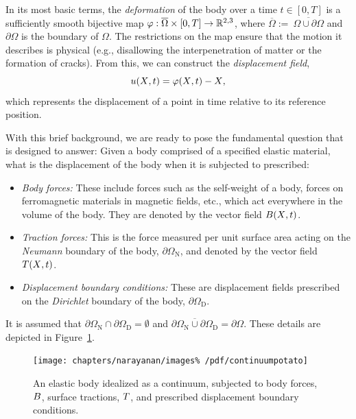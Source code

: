 In its most basic terms, the {\em deformation} of the body over a time
$t \in [0, T]$ is a sufficiently smooth bijective map $\mbox{$\varphi$}:
\overline{\Omega} \times [0,T] \rightarrow \mathbb{R}^{2, 3}$, where
$\overline{\Omega} :=\ \overline{\Omega\cup\partial\Omega}$ and
$\partial\Omega$ is the boundary of $\Omega$. The restrictions on the
map ensure that the motion it describes is physical (e.g., disallowing
the interpenetration of matter or the formation of cracks). From this,
we can construct the {\em displacement field},
\begin{equation}
  \mbox{$ u$}(\mbox{$ X$}, t) = \mbox{$\varphi$}(\mbox{$ X$}, t) - \mbox{$ X$},
\end{equation}
which represents the displacement of a point in time
relative to its reference position.

With this brief background, we are ready to pose the fundamental
question that \twist{} is designed to answer: Given a body comprised
of a specified elastic material, what is the displacement of the body
when it is subjected to prescribed:
\begin{itemize}
\item {\em Body forces:} These include forces such as the self-weight
  of a body, forces on ferromagnetic materials in magnetic fields,
  etc., which act everywhere in the volume of the body. They are
  denoted by the vector field $\mbox{$ B$}(\mbox{$ X$}, t)$.
\item {\em Traction forces:} This is the force measured per unit
  surface area acting on the {\em Neumann} boundary of the body,
  $\partial\Omega_{\mathrm{N}}$, and denoted by the vector field
  $\mbox{$ T$}(\mbox{$ X$}, t)$.
\item {\em Displacement boundary conditions:} These are displacement
  fields prescribed on the {\em Dirichlet} boundary of the body,
  $\partial\Omega_{\mathrm{D}}$.
\end{itemize}
It is assumed that $\partial\Omega_{\mathrm{N}}
\cap \partial\Omega_{\mathrm{D}} = \emptyset$ and
$\overline{\partial\Omega_{\mathrm{N}} \cup \partial\Omega_{\mathrm{D}}}
= \partial\Omega$. These details are depicted in
Figure~\ref{fig:narayanan:continuumpotato}.

\begin{figure}
  \begin{center}
    \texttt{[image: chapters/narayanan/images\%
      /pdf/continuumpotato]}
    \label{fig:narayanan:continuumpotato}
  \end{center}
  \caption{An elastic body idealized as a continuum, subjected to body
    forces, $\mbox{$ B$}$, surface tractions, $\mbox{$ T$}$, and prescribed
    displacement boundary conditions.}
\end{figure}

